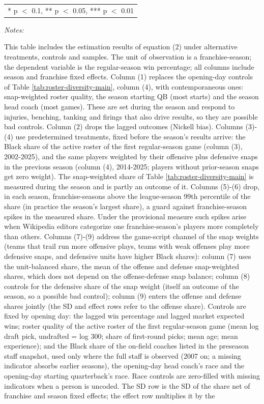 \begin{table}[!h]
{\begin{threeparttable}
\begin{tabular}[t]{lccccccccc}
\bottomrule
\multicolumn{10}{l}{\rule{0pt}{1em}* p $<$ 0.1, ** p $<$ 0.05, *** p $<$ 0.01}\\
\end{tabular}
\begin{tablenotes}[para]
\item \textit{Notes:} 
\item This table includes the estimation results of equation (2) under alternative treatments, controls and samples. The unit of observation is a franchise-season; the dependent variable is the regular-season win percentage; all columns include season and franchise fixed effects. Column (1) replaces the opening-day controls of Table \ref{tab:roster-diversity-main}, column (4), with contemporaneous ones: snap-weighted roster quality, the season starting QB (most starts) and the season head coach (most games). These are set during the season and respond to injuries, benching, tanking and firings that also drive results, so they are possible bad controls. Column (2) drops the lagged outcomes (Nickell bias). Columns (3)-(4) use predetermined treatments, fixed before the season's results arrive: the Black share of the active roster of the first regular-season game (column (3), 2002-2025), and the same players weighted by their offensive plus defensive snaps in the previous season (column (4), 2014-2025; players without prior-season snaps get zero weight). The snap-weighted share of Table \ref{tab:roster-diversity-main} is measured during the season and is partly an outcome of it. Columns (5)-(6) drop, in each season, franchise-seasons above the league-season 99th percentile of the share (in practice the season's largest share), a guard against franchise-season spikes in the measured share. Under the provisional measure such spikes arise when Wikipedia editors categorize one franchise-season's players more completely than others. Columns (7)-(9) address the game-script channel of the snap weights (teams that trail run more offensive plays, teams with weak offenses play more defensive snaps, and defensive units have higher Black shares): column (7) uses the unit-balanced share, the mean of the offense and defense snap-weighted shares, which does not depend on the offense-defense snap balance; column (8) controls for the defensive share of the snap weight (itself an outcome of the season, so a possible bad control); column (9) enters the offense and defense shares jointly (the SD and effect rows refer to the offense share).  Controls are fixed by opening day: the lagged win percentage and lagged market expected wins; roster quality of the active roster of the first regular-season game (mean log draft pick, undrafted = log 300; share of first-round picks; mean age; mean experience); and the Black share of the on-field coaches listed in the preseason staff snapshot, used only where the full staff is observed (2007 on; a missing indicator absorbs earlier seasons), the opening-day head coach's race and the opening-day starting quarterback's race. Race controls are zero-filled with missing indicators when a person is uncoded. The SD row is the SD of the share net of franchise and season fixed effects; the effect row multiplies it by the 
\end{tablenotes}
\end{threeparttable}}
\end{table}
